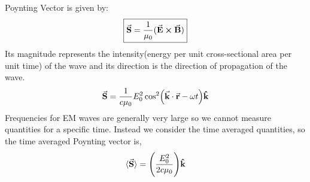 \documentclass[12pt, oneside]{book}
\begin{document}
Poynting Vector is given by:
\begin{equation}
	\boxed{\va{S}=\frac{1}{\mu_0}(\va{E}\cross\va{B})}
\end{equation}
Its magnitude represents the intensity(energy per unit cross-sectional area per unit time) of the wave and its direction is the direction of propagation of the wave. 
\begin{equation}
	\va{S}=\frac{1}{c\mu_0}E_0^2\cos[2](\va{k}\cdot\va{r}-\omega t)\vu{k}
\end{equation}
Frequencies for EM waves are generally very large so we cannot measure quantities for a specific time. Instead we consider the time averaged quantities, so the time averaged Poynting vector is,
\begin{equation}
	\langle\va{S}\rangle=\Bigg(\dfrac{E_0^2}{2c\mu_0}\Bigg)\vu{k}
\end{equation}
\end{document}
